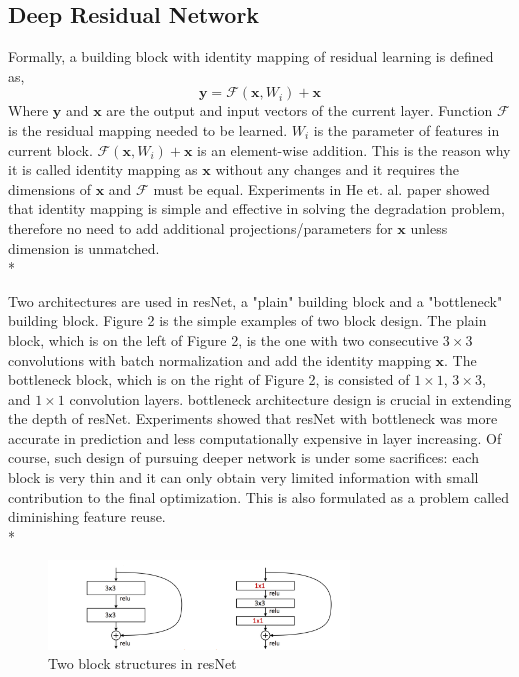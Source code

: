 \documentclass{article} %
\begin{document}
\subsection{Deep Residual Network}
Formally, a building block with identity mapping of residual learning is defined as,
\begin{equation}
\boldsymbol{y} = \mathcal{F}(\boldsymbol{x},{W_i}) + \boldsymbol{x}
\end{equation}
Where $\boldsymbol{y}$ and $\boldsymbol{x}$ are the output and input vectors of the current layer.  Function $\mathcal{F}$ is the residual mapping needed to be learned. $W_i$ is the parameter of features in current block.  $\mathcal{F}(\boldsymbol{x},{W_i}) + \boldsymbol{x}$ is an element-wise addition.  This is the reason why it is called identity mapping as $\boldsymbol{x}$ without any changes and it requires the dimensions of $\boldsymbol{x}$ and $\mathcal{F}$ must be equal. Experiments in He et. al. paper showed that identity mapping is simple and effective in solving the degradation problem, therefore no need to add additional projections/parameters for $ \boldsymbol{x}$ unless dimension is unmatched. \\*

Two architectures are used in resNet, a "plain" building block and a "bottleneck" building block. Figure 2 is the simple examples of two block design. The plain block, which is on the left of Figure 2, is the one with two consecutive $3 \times 3$ convolutions with batch normalization and add the identity mapping $\boldsymbol{x}$. The bottleneck block, which is on the right of Figure 2, is consisted of $1 \times 1$, $3 \times 3$, and $1 \times 1$ convolution layers. bottleneck architecture design is crucial in extending the depth of resNet. Experiments showed that resNet with bottleneck was more accurate in prediction and less computationally expensive in layer increasing. Of course, such design of pursuing deeper network is under some sacrifices: each block is very thin and it can only obtain very limited information with small contribution to the final optimization. This is also formulated as a problem called diminishing feature reuse. \\*

\begin{figure}[h]
\centering
\includegraphics[width=8cm]{bottleneck}
 \caption{Two block structures in resNet}
\end{figure}
\end{document}
